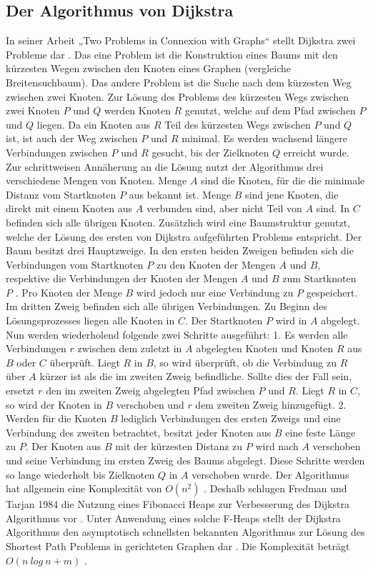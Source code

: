 \subsection{Der Algorithmus von Dijkstra}

In seiner Arbeit „Two Problems in Connexion with Graphs“ stellt Dijkstra zwei Probleme dar \cite{Dijkstra.1959}. Das eine Problem ist die Konstruktion eines Baums mit den kürzesten Wegen zwischen den Knoten eines Graphen (vergleiche Breitensuchbaum). Das andere Problem ist die Suche nach dem kürzesten Weg zwischen zwei Knoten.
Zur Lösung des Problems des kürzesten Wegs zwischen zwei Knoten $P$ und $Q$ werden Knoten $R$ genutzt, welche auf dem Pfad zwischen $P$ und $Q$ liegen. Da ein Knoten aus $R$ Teil des kürzesten Wegs zwischen $P$ und $Q$ ist, ist auch der Weg zwischen $P$ und $R$ minimal. Es werden wachsend längere Verbindungen zwischen $P$ und $R$ gesucht, bis der Zielknoten $Q$ erreicht wurde.
Zur schrittweisen Annäherung an die Lösung nutzt der Algorithmus drei verschiedene Mengen von Knoten. Menge $A$ sind die Knoten, für die die minimale Distanz vom Startknoten $P$ aus bekannt ist. Menge $B$ sind jene Knoten, die direkt mit einem Knoten aus $A$ verbunden sind, aber nicht Teil von $A$ sind. In $C$ befinden sich alle übrigen Knoten.
Zusätzlich wird eine Baumstruktur genutzt, welche der Lösung des ersten von Dijkstra aufgeführten Problems entspricht. Der Baum besitzt drei Hauptzweige. In den ersten beiden Zweigen befinden sich die Verbindungen vom Startknoten $P$ zu den Knoten der Mengen $A$ und $B$, respektive die Verbindungen der Knoten der Mengen $A$ und $B$ zum Startknoten $P$ . Pro Knoten der Menge $B$ wird jedoch nur eine Verbindung zu $P$ gespeichert. Im dritten Zweig befinden sich alle übrigen Verbindungen. 
Zu Beginn des Lösungsprozesses liegen alle Knoten in $C$. Der Startknoten $P$ wird in $A$ abgelegt. Nun werden wiederholend folgende zwei Schritte ausgeführt:
1.	Es werden alle Verbindungen $r$ zwischen dem zuletzt in $A$ abgelegten Knoten und Knoten $R$ aus $B$ oder $C$ überprüft. Liegt $R$ in $B$, so wird überprüft, ob die Verbindung zu $R$ über $A$ kürzer ist als die im zweiten Zweig befindliche. Sollte dies der Fall sein, ersetzt $r$ den im zweiten Zweig abgelegten Pfad zwischen $P$ und $R$. Liegt $R$ in $C$, so wird der Knoten in $B$ verschoben und $r$ dem zweiten Zweig hinzugefügt.
2.	Werden für die Knoten $B$ lediglich Verbindungen des ersten Zweigs und eine Verbindung des zweiten betrachtet, besitzt jeder Knoten aus $B$ eine feste Länge zu $P$. Der Knoten aus $B$ mit der kürzesten Distanz zu $P$ wird nach $A$ verschoben und seine Verbindung im ersten Zweig des Baums abgelegt.
Diese Schritte werden so lange wiederholt bis Zielknoten $Q$ in $A$ verschoben wurde.
Der Algorithmus hat allgemein eine Komplexität von $O(n^2)$ \cite{Madkour.2017}. Deshalb schlugen Fredman und Tarjan 1984 die Nutzung eines Fibonacci Heaps zur Verbesserung des Dijkstra Algorithmus vor \cite{Fredman.1987}. Unter Anwendung eines solche F-Heaps stellt der Dijkstra Algorithmus den asymptotisch schnellsten bekannten Algorithmus zur Lösung des Shortest Path Problems in gerichteten Graphen dar \cite{Schmitz.2019}.  Die Komplexität beträgt $O(n\ log\ n + m)$ \cite{Madkour.2017}. 



